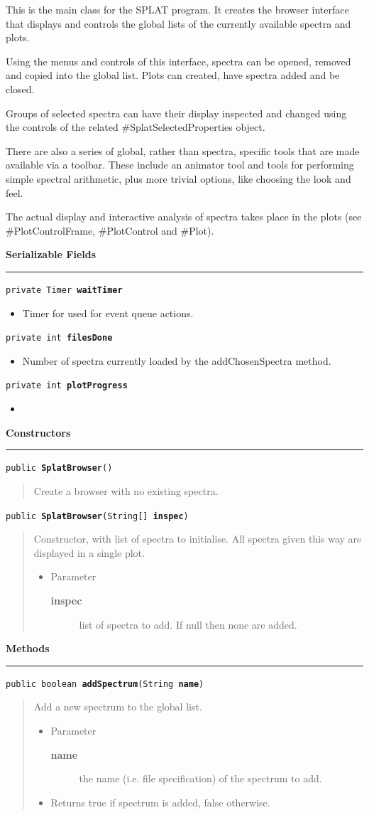 \documentclass[twoside,11pt]{article}
\renewcommand{\_}{\texttt{\symbol{95}}}
\newcommand{\method}[1]{\texttt{#1}}
\newenvironment{desc}{\begin{quote}}{\end{quote}}
\newcommand{\constructors}{
   \par\textbf{\large{Constructors}}\\
   \hrule
}
\newcommand{\methods}{
   \par\textbf{\large{Methods}}\\
   \hrule
}
\newcommand{\fields}[1]{
   \par\textbf{\large{#1}}\\
   \hrule
}
\newcommand{\field}[2]{
   \par\texttt{#1}
   \begin{itemize}
   \item #2
   \end{itemize}
}
\begin{document}
{This is the main class for the SPLAT program. It creates the
 browser interface that displays and controls the global lists of
 the currently available spectra and plots.

 Using the menus and controls of this interface, spectra can be
 opened, removed and copied into the global list. Plots can created,
 have spectra added and be closed.

 Groups of selected spectra can have their display inspected and
 changed using the controls of the related \#SplatSelectedProperties
 object.

 There are also a series of global, rather than spectra, specific
 tools that are made available via a toolbar. These include an
 animator tool and tools for performing simple spectral arithmetic,
 plus more trivial options, like choosing the look and feel.

 The actual display and interactive analysis of spectra takes place
 in the plots (see \#PlotControlFrame, \#PlotControl and \#Plot).}
\fields{Serializable Fields}
\field{private Timer \textbf{waitTimer}}{Timer for used for event queue actions.}
\field{private int \textbf{filesDone}}{Number of spectra currently loaded by the addChosenSpectra method.}
\field{private int \textbf{plotProgress}}{}

\constructors
\method{public \textbf{SplatBrowser}()\label{l336}\label{l337}}
\begin{desc}Create a browser with no existing spectra.
\end{desc}

\method{public \textbf{SplatBrowser}(\texttt{String[]} \textbf{inspec})\label{l338}\label{l339}}
\begin{desc}Constructor, with list of spectra to initialise. All spectra
 given this way are displayed in a single plot.
\begin{itemize}
\item{Parameter
  \begin{description}
   \item[\textbf{inspec}]{list of spectra to add. If null then none are
                added.}
  \end{description}}
\end{itemize}
\end{desc}

\methods
\method{public boolean \textbf{addSpectrum}(\texttt{String} \textbf{name})\label{l340}\label{l341}}
\begin{desc}Add a new spectrum to the global list.
\begin{itemize}
\item{Parameter
  \begin{description}
   \item[\textbf{name}]{the name (i.e. file specification) of the spectrum
              to add.}
  \end{description}}
\end{itemize}
\begin{itemize}
\item{Returns true if spectrum is added, false otherwise. }
\end{itemize}
\end{desc}
\end{document}
